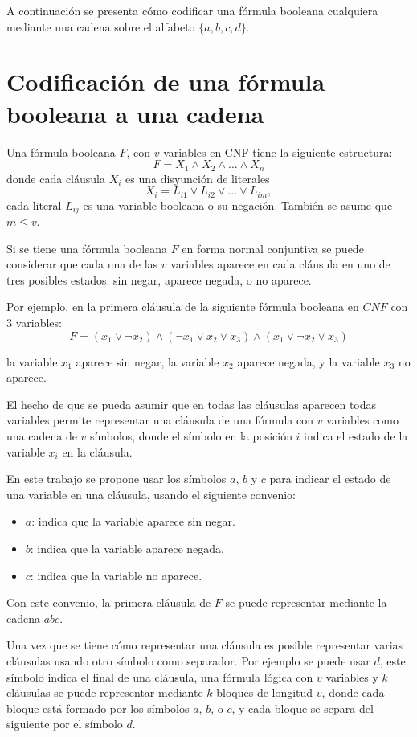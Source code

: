 \documentclass[12pt]{article}
\begin{document}
A continuación se presenta cómo codificar una fórmula booleana cualquiera mediante una cadena sobre el alfabeto $\{a,b,c,d\}$.

\section{Codificación de una fórmula booleana a una cadena}
\label{sec:codsat}

Una fórmula booleana $F$, con $v$ variables en CNF tiene la siguiente estructura:
$$F=X_1 \wedge X_2 \wedge \ldots \wedge X_n$$
donde cada cláusula $X_i$ es una disyunción de literales
$$X_i=L_{i1} \vee L_{i2} \vee \ldots \vee L_{im},$$
cada literal $L_{ij}$ es una variable booleana o su negación. También se asume que $m\leq v$. 

Si se tiene una fórmula booleana $F$ en forma normal conjuntiva se puede considerar que cada una de las $v$ variables aparece en cada cláusula en uno de tres posibles estados: sin negar, aparece negada, o no aparece.

Por ejemplo, en la primera cláusula de la siguiente fórmula booleana en $CNF$ con 3 variables:
$$F=(x_1 \vee \neg x_2) \wedge (\neg x_1 \vee x_2 \vee x_3) \wedge (x_1 \vee \neg x_2 \vee x_3)$$

la variable $x_1$ aparece sin negar, la variable $x_2$ aparece negada, y la variable $x_{3}$ no aparece.

El hecho de que se pueda asumir que en todas las cláusulas aparecen todas variables permite representar una cláusula de una fórmula con $v$ variables como una cadena de $v$ símbolos, donde el símbolo en la posición $i$ indica el estado de la variable $x_i$ en la cláusula.

En este trabajo se propone usar los símbolos $a$, $b$ y $c$ para indicar el estado de una variable en una cláusula, usando el siguiente convenio:

\begin{itemize}
    \item $a$: indica que la variable aparece sin negar.
    \item $b$: indica que la variable aparece negada.
    \item $c$: indica que la variable no aparece.
\end{itemize}

Con este convenio, la primera cláusula de $F$ se puede representar mediante la cadena $abc$.

Una vez que se tiene cómo representar una cláusula es posible representar varias cláusulas usando otro símbolo como separador.
Por ejemplo se puede usar $d$, este símbolo indica el final de una cláusula, una fórmula lógica con $v$ variables y $k$ cláusulas se puede representar mediante $k$ bloques de longitud $v$, donde cada bloque está formado por los símbolos $a$, $b$, o $c$, y cada bloque se separa del siguiente por el símbolo $d$.
\end{document}
